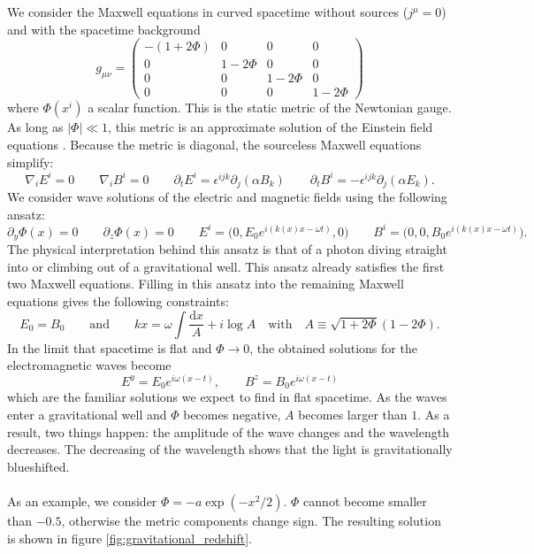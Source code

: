 \documentclass{article}
\begin{document}
We consider the Maxwell equations in curved spacetime \cite{Alcubierre2009} without sources ($j^\mu = 0$) and with the spacetime background
\begin{equation}
    g_{\mu\nu} = \begin{pmatrix}
        -(1+2\Phi) & 0 & 0 & 0\\
        0 & 1-2\Phi & 0 & 0\\
        0 & 0 & 1-2\Phi & 0\\
        0 & 0 & 0 & 1-2\Phi
    \end{pmatrix}
\end{equation}
where $\Phi(x^i)$ a scalar function. This is the static metric of the Newtonian gauge. As long as $|\Phi| \ll 1$, this metric is an approximate solution of the Einstein field equations \cite{1995ApJ}. Because the metric is diagonal, the sourceless Maxwell equations simplify:
\begin{equation}
    \nabla_i E^i = 0 \qquad \nabla_i B^i = 0 \qquad \partial_t E^i = \epsilon^{ijk} \partial_j (\alpha B_k) \qquad \partial_t B^i = -\epsilon^{ijk} \partial_j (\alpha E_k).
\end{equation}
We consider wave solutions of the electric and magnetic fields using the following ansatz:
\begin{equation}
    \partial_y \Phi(x) = 0 \qquad \partial_z \Phi(x) = 0 \qquad E^i = \big(0, E_0 e^{i(k(x)x-\omega t)}, 0\big) \qquad B^i = \big(0, 0, B_0 e^{i(k(x)x-\omega t)}\big).
\end{equation}
The physical interpretation behind this ansatz is that of a photon diving straight into or climbing out of a gravitational well. This ansatz already satisfies the first two Maxwell equations. Filling in this ansatz into the remaining Maxwell equations gives the following constraints:
\begin{equation}
E_0 = B_0 \qquad\text{and}\qquad kx = \omega \int \frac{\text{d}x}{A} + i\log{A} \quad\text{with}\quad A \equiv \sqrt{1 + 2\Phi}(1 - 2\Phi).
\end{equation}
In the limit that spacetime is flat and $\Phi \to 0$, the obtained solutions for the electromagnetic waves become
\begin{equation}
    E^y = E_0 e^{i\omega(x-t)}, \qquad B^z = B_0 e^{i\omega(x-t)}
\end{equation}
which are the familiar solutions we expect to find in flat spacetime. As the waves enter a gravitational well and $\Phi$ becomes negative, $A$ becomes larger than $1$. As a result, two things happen: the amplitude of the wave changes and the wavelength decreases. The decreasing of the wavelength shows that the light is gravitationally blueshifted.\\
\\
As an example, we consider $\Phi = -a \exp{(-x^2/2)}$. $\Phi$ cannot become smaller than $-0.5$, otherwise the metric components change sign. The resulting solution is shown in figure \ref{fig:gravitational_redshift}.
\end{document}
